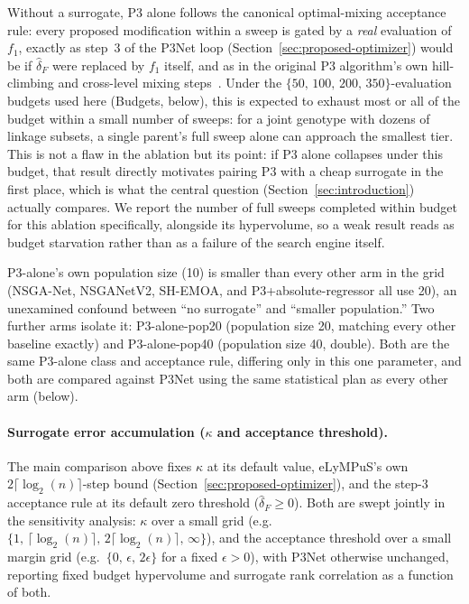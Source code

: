 Without a surrogate, P3 alone follows the canonical optimal-mixing acceptance rule: every proposed
modification within a sweep is gated by a \emph{real} evaluation of $f_1$, exactly as step~3 of the P3Net
loop (Section~\ref{sec:proposed-optimizer}) would be if $\hat{\delta}_F$ were replaced by $f_1$ itself, and as in the original
P3 algorithm's own hill-climbing and cross-level mixing steps~\citep{goldman2014parameterless}. Under the
$\{50,\, 100,\, 200,\, 350\}$-evaluation budgets used here (Budgets, below), this is expected to exhaust most or
all of the budget within a small number of sweeps: for a joint genotype with dozens of linkage subsets, a
single parent's full sweep alone can approach the smallest tier. This is not a flaw in the ablation but its
point: if P3 alone collapses under this budget, that result directly motivates pairing P3 with a cheap
surrogate in the first place, which is what the central question (Section~\ref{sec:introduction}) actually compares. We
report the number of full sweeps completed within budget for this ablation specifically, alongside its
hypervolume, so a weak result reads as budget starvation rather than as a failure of the search engine
itself.

P3-alone's own population size (10) is smaller than every other arm in the grid (NSGA-Net, NSGANetV2,
SH-EMOA, and P3+absolute-regressor all use 20), an unexamined confound between ``no surrogate'' and
``smaller population.'' Two further arms isolate it: P3-alone-pop20 (population size 20, matching every
other baseline exactly) and P3-alone-pop40 (population size 40, double). Both are the same P3-alone class
and acceptance rule, differing only in this one parameter, and both are compared against P3Net using the
same statistical plan as every other arm (below).

\paragraph{Surrogate error accumulation ($\kappa$ and acceptance threshold).} The main comparison above
fixes $\kappa$ at its default value, eLyMPuS's own $2\lceil\log_2(n)\rceil$-step bound (Section~\ref{sec:proposed-optimizer}),
and the step-3 acceptance rule at its default zero threshold ($\hat{\delta}_F \geq 0$). Both are swept
jointly in the sensitivity analysis: $\kappa$ over a small grid (e.g.\ $\{1,\, \lceil\log_2(n)\rceil,\,
2\lceil\log_2(n)\rceil,\, \infty\}$), and the acceptance threshold over a small margin grid (e.g.\ $\{0,\,
\epsilon,\, 2\epsilon\}$ for a fixed $\epsilon > 0$), with P3Net otherwise unchanged, reporting fixed budget
hypervolume and surrogate rank correlation as a function of both.

